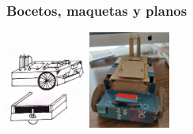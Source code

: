 \documentclass{beamer}
\begin{document}
\begin{frame}
\begin{columns}
\begin{column}{0.5\textwidth}
		\end{column}
	\end{columns}

\end{frame}

\begin{frame}
	\frametitle{Bocetos, maquetas y planos}
	\begin{center}
		\includegraphics[width=0.2\textwidth]{figs/boceto_papel.jpeg} \hspace{0.5cm}
		\includegraphics[width=0.2\textwidth]{figs/boceto_carton5.jpeg}
	\end{center}


\end{frame}
\end{document}
